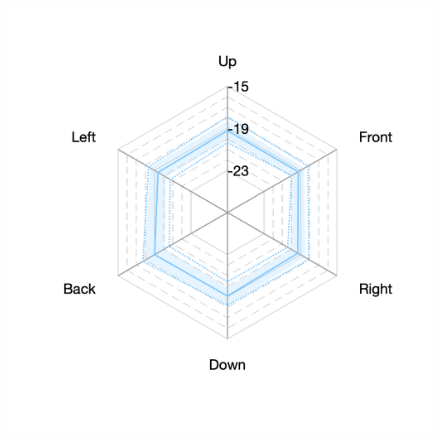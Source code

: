 \documentclass[11pt,a4j]{jreport}
\begin{document}
\begin{figure}[H]
\begin{minipage}[b]{.33\textwidth}
        \label{fig:S06late}
      \end{minipage}%
      \begin{minipage}[b]{.33\textwidth}
        \centering
        \includegraphics[width=1\linewidth]{images/realHallDirSt/late_S05_allhall.png}
        \label{fig:S04late}
      \end{minipage}


\end{figure}
\end{document}
